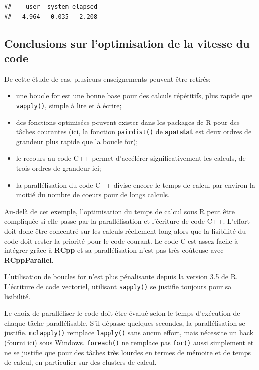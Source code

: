 \documentclass[
  12pt,
  french,
  a4paper,
  extrafontsizes,onecolumn,openright
  ]{memoir}
\providecommand{\tightlist}{%
  \setlength{\itemsep}{0pt}\setlength{\parskip}{0pt}}
\begin{document}
\begin{verbatim}
##    user  system elapsed 
##   4.964   0.035   2.208
\end{verbatim}

\normalsize

\hypertarget{conclusions-sur-loptimisation-de-la-vitesse-du-code}{%
\subsection{Conclusions sur l'optimisation de la vitesse du code}\label{conclusions-sur-loptimisation-de-la-vitesse-du-code}}

De cette étude de cas, plusieurs enseignements peuvent être retirés:

\begin{itemize}
\tightlist
\item
  une boucle for est une bonne base pour des calculs répétitifs, plus rapide que \texttt{vapply()}, simple à lire et à écrire;
\item
  des fonctions optimisées peuvent exister dans les packages de R pour des tâches courantes (ici, la fonction \texttt{pairdist()} de \textbf{spatstat} est deux ordres de grandeur plus rapide que la boucle for);
\item
  le recours au code C++ permet d'accélérer significativement les calculs, de trois ordres de grandeur ici;
\item
  la parallélisation du code C++ divise encore le temps de calcul par environ la moitié du nombre de coeurs pour de longs calculs.
\end{itemize}

Au-delà de cet exemple, l'optimisation du temps de calcul sous R peut être compliquée si elle passe par la parallélisation et l'écriture de code C++.
L'effort doit donc être concentré sur les calculs réellement long alors que la lisibilité du code doit rester la priorité pour le code courant.
Le code C est assez facile à intégrer grâce à \textbf{RCpp} et sa parallélisation n'est pas très coûteuse avec \textbf{RCppParallel}.

L'utilisation de boucles for n'est plus pénalisante depuis la version 3.5 de R.
L'écriture de code vectoriel, utilisant \texttt{sapply()} se justifie toujours pour sa lisibilité.

Le choix de paralléliser le code doit être évalué selon le temps d'exécution de chaque tâche parallélisable.
S'il dépasse quelques secondes, la parallélisation se justifie.
\texttt{mclapply()} remplace \texttt{lapply()} sans aucun effort, mais nécessite un hack (fourni ici) sous Windows.
\texttt{foreach()} ne remplace pas \texttt{for()} aussi simplement et ne se justifie que pour des tâches très lourdes en termes de mémoire et de temps de calcul, en particulier sur des clusters de calcul.
\end{document}
